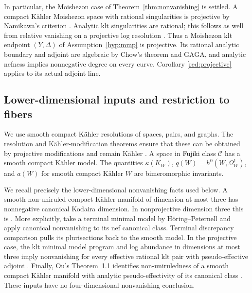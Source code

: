 \documentclass[11pt,letterpaper]{article}
\theoremstyle{definition}
\theoremstyle{remark}
\begin{document}
In particular, the Moishezon case of Theorem~\ref{thm:nonvanishing} is
settled. A compact Kähler Moishezon space with rational singularities is
projective by Namikawa's criterion \cite{NamikawaProjectivity}. Analytic klt
singularities are rational; this follows as well from relative vanishing
on a projective log resolution \cite{FujinoAnalyticMMP}. Thus a
Moishezon klt endpoint \((Y,\Delta)\) of
Assumption~\ref{hyp:mmp} is projective. Its rational analytic boundary
and adjoint are algebraic by Chow's theorem and GAGA, and analytic
nefness implies nonnegative degree on every curve. Corollary
\ref{red:projective} applies to its actual adjoint line.

\subsection{Lower-dimensional inputs and restriction to fibers}

We use smooth compact Kähler resolutions of spaces, pairs, and graphs.
The resolution and Kähler-modification theorems ensure that these can
be obtained by projective modifications and remain Kähler
\cite{HironakaResolution,VarouchasKahler}. A space in Fujiki class \(\mathcal C\)
has a smooth compact Kähler model. The quantities
\(\kappa(K_W)\), \(q(W)=h^0(W,\Omega_W^1)\), and \(a(W)\) for smooth
compact Kähler \(W\) are bimeromorphic invariants.

We recall precisely the lower-dimensional nonvanishing facts used
below. A smooth non-uniruled compact Kähler manifold of dimension at
most three has nonnegative canonical Kodaira dimension. In
nonprojective dimension three this is
\cite[Corollary~1.4]{HPMinimalModels}. More explicitly, take a terminal
minimal model by Höring--Peternell and apply canonical nonvanishing
\cite[Theorem~0.3]{DemaillyPeternellNonvanishing} to its nef canonical
class. Terminal discrepancy comparison pulls its plurisections back
to the smooth model.
In the projective case, the klt minimal model program and log abundance
in dimensions at most three imply nonvanishing for every effective
rational klt pair with pseudo-effective adjoint \cite{ThreefoldFlipsAbundance,KeelMatsukiMcKernan,KeelMatsukiMcKernanCorrection}.
Finally, Ou's Theorem~1.1 identifies non-uniruledness of a smooth compact
Kähler manifold with analytic pseudo-effectivity of its canonical class
\cite{OuUniruledness}. These inputs have no four-dimensional nonvanishing
conclusion.
\end{document}
